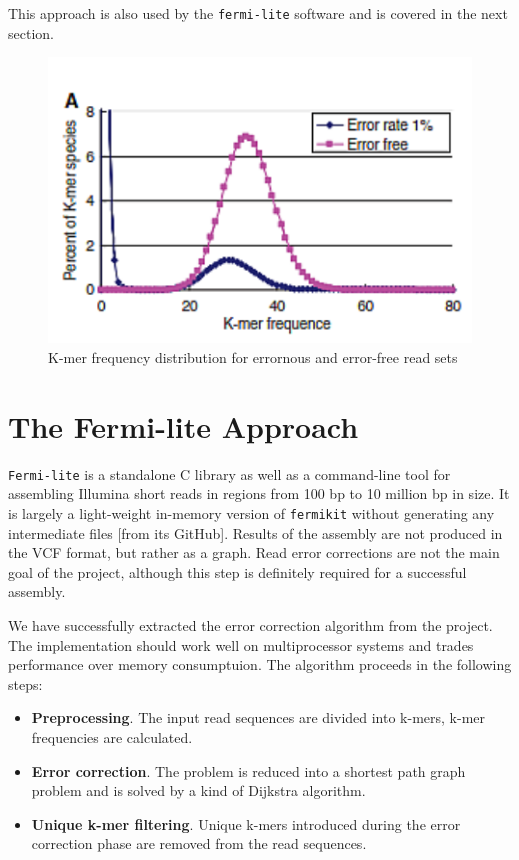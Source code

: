 This approach is also used by the \texttt{fermi-lite} software and is covered in the next section.

\begin{figure}[h]
	\centering
	\includegraphics{img/kmer-frequency-distribution.pdf}
	\caption{K-mer frequency distribution for errornous and error-free read sets}
	\label{fig:kmer-frequency-distribution}
\end{figure}

\section{The Fermi-lite Approach}
\label{sec:fermi-lite}

\texttt{Fermi-lite} is a standalone C library as well as a command-line tool for assembling Illumina short reads in regions from 100 bp to 10 million bp in size. It is largely a light-weight in-memory version of \texttt{fermikit} without generating any intermediate files [from its GitHub]. Results of the assembly are not produced in the VCF format, but rather as a graph. Read error corrections are not the main goal of the project, although this step is definitely required for a successful assembly.

We have successfully extracted the error correction algorithm from the project. The implementation should work well on multiprocessor systems and trades performance over memory consumptuion. The algorithm proceeds in the following steps:
\begin{itemize}
\item \textbf{Preprocessing}. The input read sequences are divided into k-mers, k-mer frequencies are calculated.
\item \textbf{Error correction}. The problem is reduced into a shortest path graph problem and is solved by a kind of Dijkstra algorithm.
\item \textbf{Unique k-mer filtering}. Unique k-mers introduced during the error correction phase are removed from the read sequences.
\end{itemize}
 
